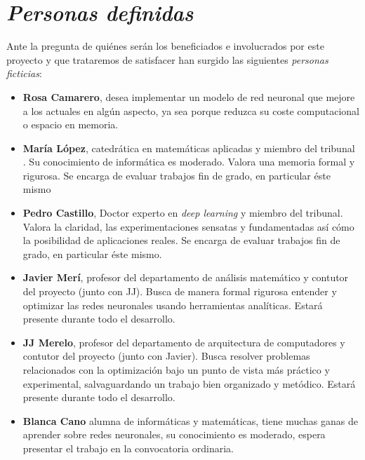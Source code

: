 \section{\textit{Personas definidas}}  \label{ch:metodología_personas}

Ante la pregunta de quiénes serán los beneficiados e involucrados por este proyecto y que trataremos de satisfacer
han surgido 
las siguientes \textit{personas ficticias}:

\begin{itemize}

    \item \textbf{Rosa Camarero}, desea implementar un modelo de red neuronal que mejore a los actuales en algún aspecto, ya sea porque reduzca su coste computacional o espacio en memoria. 

    \item \textbf{María López}, catedrática en matemáticas aplicadas y miembro del tribunal . Su conocimiento
    de informática es moderado. Valora una memoria formal y rigurosa. Se encarga de evaluar trabajos fin de grado, en particular éste mismo
    
    \item \textbf{Pedro Castillo}, Doctor experto en \textit{deep learning} y miembro del tribunal. Valora la claridad, las experimentaciones sensatas y fundamentadas así cómo la posibilidad de aplicaciones reales. Se encarga de evaluar trabajos fin de grado, en particular éste mismo. 
    
    \item \textbf{Javier Merí}, profesor del departamento de análisis matemático y contutor del proyecto (junto con JJ). Busca de manera formal rigurosa entender y optimizar las redes neuronales usando herramientas analíticas. Estará presente durante todo el desarrollo. 
    
    \item   \textbf{JJ Merelo}, profesor del departamento de arquitectura de computadores y contutor del proyecto (junto con Javier). 
    Busca resolver problemas relacionados con la optimización bajo un punto de vista más práctico y experimental, salvaguardando un trabajo bien organizado y metódico. Estará presente durante todo el desarrollo. 

    \item \textbf{Blanca Cano} alumna de informáticas y matemáticas, tiene muchas ganas de aprender sobre redes 
    neuronales, su conocimiento es moderado, espera presentar el trabajo en la convocatoria ordinaria. 

\end{itemize}

